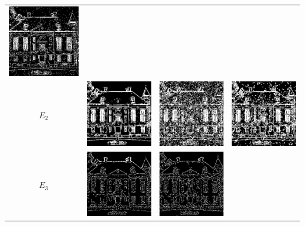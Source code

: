 \documentclass[12pt,a4paper,notitlepage,oneside,amsmath,amssymb]{article}
\begin{document}
\begin{CJK*}{UTF8}{bkai}
\begin{enumerate}[label=(\alph*)]
\begin{table}
\begin{tabular}[h!]{cccc}
			      \includegraphics[width=.25\linewidth]{E1_sample3}                                           \\
			      \(E_2\)                                           &
			      \includegraphics[width=.25\linewidth]{E2_sample1} &
			      \includegraphics[width=.25\linewidth]{E2_sample2} &
			      \includegraphics[width=.25\linewidth]{E2_sample3}                                           \\
			      \(E_3\)                                           &
			      \includegraphics[width=.25\linewidth]{E3_sample1} &
			      \includegraphics[width=.25\linewidth]{E3_sample2} &

\end{tabular}
\end{table}
\end{enumerate}
\end{CJK*}
\end{document}
